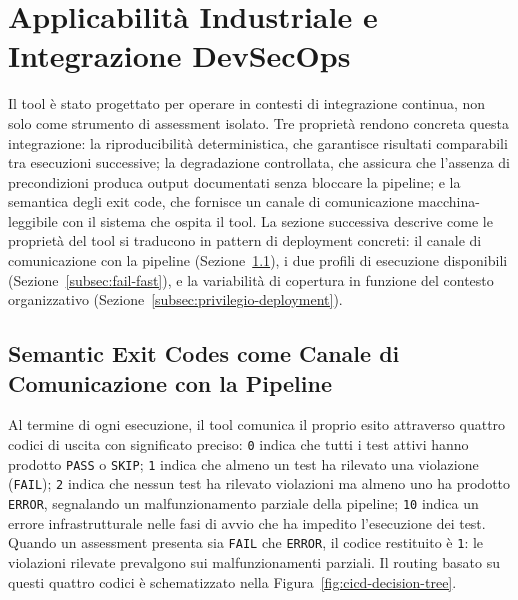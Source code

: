 \section{Applicabilità Industriale e Integrazione DevSecOps}%
\label{sec:devsecops}

Il tool è stato progettato per operare in contesti di integrazione continua, non solo come strumento di assessment isolato. Tre proprietà rendono concreta questa integrazione: la riproducibilità deterministica, che garantisce risultati comparabili tra esecuzioni successive; la degradazione controllata, che assicura che l'assenza di precondizioni produca output documentati senza bloccare la pipeline; e la semantica degli exit code, che fornisce un canale di comunicazione macchina-leggibile con il sistema che ospita il tool. La sezione successiva descrive come le proprietà del tool si traducono in pattern di deployment concreti: il canale di comunicazione con la pipeline (Sezione~\ref{subsec:exit-codes}), i due profili di esecuzione disponibili (Sezione~\ref{subsec:fail-fast}), e la variabilità di copertura in funzione del contesto organizzativo (Sezione~\ref{subsec:privilegio-deployment}).

\subsection{Semantic Exit Codes come Canale di Comunicazione con la Pipeline}\label{subsec:exit-codes}

Al termine di ogni esecuzione, il tool comunica il proprio esito attraverso quattro codici di uscita con significato preciso: \texttt{0} indica che tutti i test attivi hanno prodotto \texttt{PASS} o \texttt{SKIP}; \texttt{1} indica che almeno un test ha rilevato una violazione (\texttt{FAIL}); \texttt{2} indica che nessun test ha rilevato violazioni ma almeno uno ha prodotto \texttt{ERROR}, segnalando un malfunzionamento parziale della pipeline; \texttt{10} indica un errore infrastrutturale nelle fasi di avvio che ha impedito l'esecuzione dei test. Quando un assessment presenta sia \texttt{FAIL} che \texttt{ERROR}, il codice restituito è \texttt{1}: le violazioni rilevate prevalgono sui malfunzionamenti parziali. Il routing basato su questi quattro codici è schematizzato nella Figura~\ref{fig:cicd-decision-tree}.



